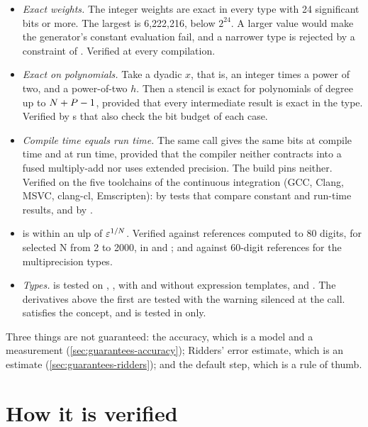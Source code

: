 \begin{itemize}
    saturating cases.
  \item \emph{Exact weights.} The integer weights are exact in every type with 24 significant bits or more. The
    largest is 6,222,216, below $2^{24}$. A larger value would make the generator's constant evaluation fail, and a
    narrower type is rejected by a constraint of . Verified at every compilation.
  \item \emph{Exact on polynomials.} Take a dyadic $x$, that is, an integer times a power of two, and a power-of-two
    $h$. Then a stencil is exact for polynomials of degree up to $N + P - 1$, provided that every
    intermediate result is exact in the type. Verified by s that also check the bit budget of
    each case.
  \item \emph{Compile time equals run time.} The same call gives the same bits at compile time and at run time,
    provided that the compiler neither contracts  into a fused multiply-add nor uses extended
    precision. The build pins neither. Verified on the five toolchains of the continuous integration (GCC, Clang,
    MSVC, clang-cl, Emscripten): by tests that compare constant and run-time results, and by
    .
  \item \emph{} is within an ulp of $\varepsilon^{1/N}$. Verified against references computed to 80
    digits, for selected N from 2 to 2000, in  and ; and against 60-digit references for the
    multiprecision types.
  \item \emph{Types.}  is tested on , ,  with and
    without expression templates, and . The  derivatives above the first are
    tested with the warning silenced at the call.  satisfies the concept, and is tested in
     only.
\end{itemize}
Three things are not guaranteed: the accuracy, which is a model and a measurement (\cref{sec:guarantees-accuracy});
Ridders' error estimate, which is an estimate (\cref{sec:guarantees-ridders}); and the default step, which is a rule
of thumb.

\section{How it is verified}\label{sec:guarantees-verification}

